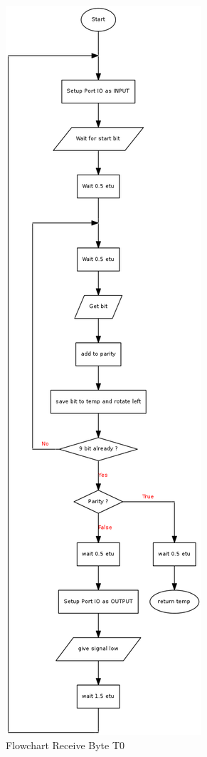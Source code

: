 \begin{figure}[!h]
\centering
\includegraphics[height=0.9\textheight]{image/hal/flow_rxbytet0.png}
\caption{Flowchart Receive Byte T0}
\label{fig-flow-rxbytet0}
\end{figure}

